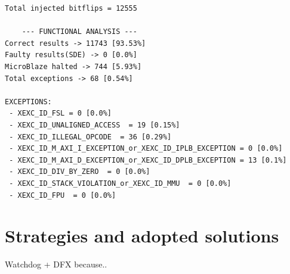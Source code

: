 \newpage
\begin{lstlisting}[style=preformatted]
Total injected bitflips = 12555

    --- FUNCTIONAL ANALYSIS ---
Correct results -> 11743 [93.53%]
Faulty results(SDE) -> 0 [0.0%]
MicroBlaze halted -> 744 [5.93%]
Total exceptions -> 68 [0.54%]

EXCEPTIONS:
 - XEXC_ID_FSL = 0 [0.0%]
 - XEXC_ID_UNALIGNED_ACCESS  = 19 [0.15%]
 - XEXC_ID_ILLEGAL_OPCODE  = 36 [0.29%]
 - XEXC_ID_M_AXI_I_EXCEPTION_or_XEXC_ID_IPLB_EXCEPTION = 0 [0.0%]
 - XEXC_ID_M_AXI_D_EXCEPTION_or_XEXC_ID_DPLB_EXCEPTION = 13 [0.1%]
 - XEXC_ID_DIV_BY_ZERO  = 0 [0.0%]
 - XEXC_ID_STACK_VIOLATION_or_XEXC_ID_MMU  = 0 [0.0%]
 - XEXC_ID_FPU  = 0 [0.0%]

\end{lstlisting}


\section{Strategies and adopted solutions}




Watchdog + DFX because..

